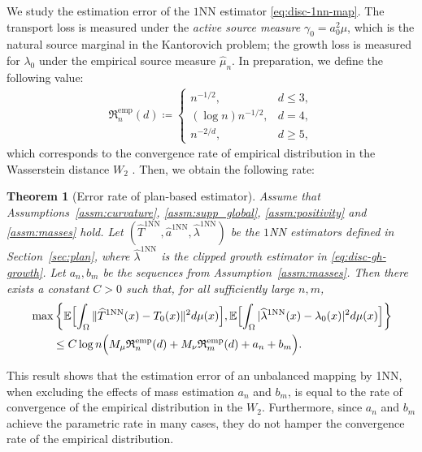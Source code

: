 \documentclass[11pt,reqno]{amsart}
\newtheorem{theorem}{Theorem}
\theoremstyle{definition}
\renewcommand{\hat}{\widehat}
\newcommand{\Ep}{\mathbb{E}}
\begin{document}
We study the estimation error of the $1$NN estimator \eqref{eq:disc-1nn-map}. The transport loss is measured under the \emph{active source measure} $\gamma_0 = a_0^2 \mu$, which is the natural source marginal in the Kantorovich problem; the growth loss is measured for $\lambda_0$ under the empirical source measure $\hat\mu_n$.
In preparation, we define the following value:
\begin{align}
    \mathfrak R_n^{\mathrm{emp}}(d)
    \coloneqq
    \begin{cases}
        n^{-1/2}, & d \le 3,\\
        (\log n)n^{-1/2}, & d = 4,\\
        n^{-2/d}, & d \ge 5,
    \end{cases}
\end{align}
which corresponds to the convergence rate of empirical distribution in the Wasserstein distance $W_2$ \cite{weed2019sharp}.
Then, we obtain the following rate: 

\begin{theorem}[Error rate of plan-based estimator]
\label{thm:main_plan_based_rates}
Assume that Assumptions~\ref{assm:curvature}, \ref{assm:supp_global}, \ref{assm:positivity} and \ref{assm:masses} hold.
Let $(\hat T^{\mathrm{1NN}},\hat a^{\mathrm{1NN}},\hat\lambda^{\mathrm{1NN}})$ be the $1$NN estimators defined in Section~\ref{sec:plan}, where $\hat\lambda^{\mathrm{1NN}}$ is the clipped growth estimator in \eqref{eq:disc-gh-growth}. Let $a_n,b_m$ be the sequences from Assumption~\ref{assm:masses}.
Then there exists a constant $C>0$ such that, for all sufficiently large $n,m$,
\begin{align}
\label{eq:section4_plan_map_rate_abstract}
    &\max\left\{\Ep\Bigl[
        \int_\Omega \|\hat T^{\mathrm{1NN}}(x)-T_0(x)\|^2  d\mu(x)
    \Bigr], \Ep\Bigl[
        \int_\Omega |\hat\lambda^{\mathrm{1NN}}(x)-\lambda_0(x)|^2  d\mu(x)
    \Bigr]\right\} \\
    &\qquad \le
    C\log n \Bigl(
        M_\mu \mathfrak R_n^{\mathrm{emp}}(d)
        + M_\nu \mathfrak R_m^{\mathrm{emp}}(d)
        + a_n+b_m
    \Bigr).
\end{align}
\end{theorem}

This result shows that the estimation error of an unbalanced mapping by 1NN, when excluding the effects of mass estimation $a_n$ and $b_m$, is equal to the rate of convergence of the empirical distribution in the $W_2$. 
Furthermore, since $a_n$ and $b_m$ achieve the parametric rate in many cases, they do not hamper the convergence rate of the empirical distribution.
\end{document}
